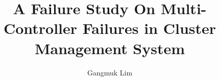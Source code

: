 \documentclass[sigplan,screen,10pt]{acmart}
\begin{document}
\title{A Failure Study On Multi-Controller Failures in Cluster Management System}

\author{Gangmuk Lim}



\maketitle








% 




\end{document}
